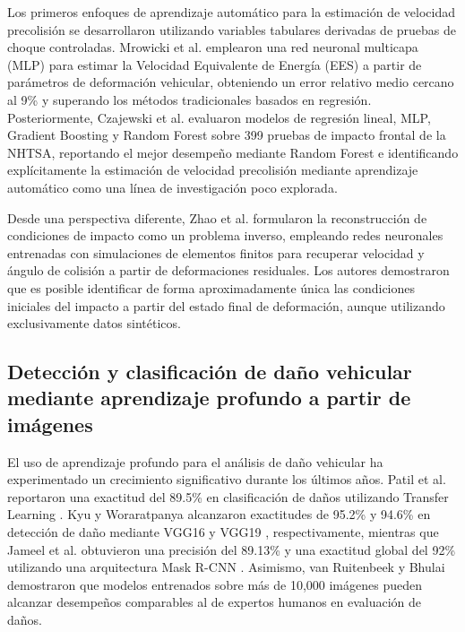 \documentclass[esp]{SpeedEstimationAI_paper}
\begin{document}
Los primeros enfoques de aprendizaje automático para la estimación de velocidad precolisión se desarrollaron utilizando variables tabulares derivadas de pruebas de choque controladas. Mrowicki et al. \cite{Mrowicki2020} emplearon una red neuronal multicapa (MLP) \cite{Goodfellow2016} para estimar la Velocidad Equivalente de Energía (EES) a partir de parámetros de deformación vehicular, obteniendo un error relativo medio cercano al 9\% y superando los métodos tradicionales basados en regresión. Posteriormente, Czajewski et al. \cite{Czajewski2026} evaluaron modelos de regresión lineal, MLP, Gradient Boosting \cite{Friedman2001} y Random Forest \cite{Breiman2001} sobre 399 pruebas de impacto frontal de la NHTSA, reportando el mejor desempeño mediante Random Forest e identificando explícitamente la estimación de velocidad precolisión mediante aprendizaje automático como una línea de investigación poco explorada.

Desde una perspectiva diferente, Zhao et al. \cite{Zhao2021} formularon la reconstrucción de condiciones de impacto como un problema inverso, empleando redes neuronales entrenadas con simulaciones de elementos finitos \cite{Bathe2006} para recuperar velocidad y ángulo de colisión a partir de deformaciones residuales. Los autores demostraron que es posible identificar de forma aproximadamente única las condiciones iniciales del impacto a partir del estado final de deformación, aunque utilizando exclusivamente datos sintéticos.

\subsection{Detección y clasificación de daño vehicular mediante aprendizaje profundo a partir de imágenes}

El uso de aprendizaje profundo para el análisis de daño vehicular ha experimentado un crecimiento significativo durante los últimos años. Patil et al. \cite{Patil2017} reportaron una exactitud del 89.5\% en clasificación de daños utilizando Transfer Learning \cite{pan2010transfer}. Kyu y Woraratpanya \cite{Kyu2020} alcanzaron exactitudes de 95.2\% y 94.6\% en detección de daño mediante VGG16 y VGG19 \cite{Simonyan2015}, respectivamente, mientras que Jameel et al. \cite{Jameel2023} obtuvieron una precisión del 89.13\% y una exactitud global del 92\% utilizando una arquitectura Mask R-CNN \cite{He2017}. Asimismo, van Ruitenbeek y Bhulai \cite{vanRuitenbeek2022} demostraron que modelos entrenados sobre más de 10,000 imágenes pueden alcanzar desempeños comparables al de expertos humanos en evaluación de daños.
\end{document}
